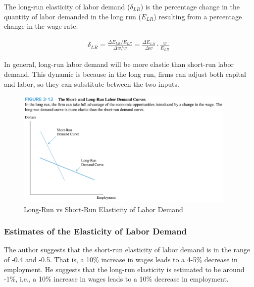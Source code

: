\FloatBarrier


\begin{definition}

    The long-run elasticity of labor demand ($\delta_{LR}$)
    is the percentage change in the quantity of labor demanded in the
    long run ($E_{LR}$)
    resulting from a percentage change in the wage rate.
    
    \begin{align}
        \delta_{L R}=\frac{\Delta E_{L R} / E_{L R}}{\Delta w / w}=\frac{\Delta E_{L R}}{\Delta w} \cdot \frac{w}{E_{L R}}
    \end{align}
    
\end{definition}


In general, long-run labor demand will be more 
elastic than short-run labor demand. This dynamic is 
because in the long run, firms can adjust 
both capital and labor, so they can 
substitute between the two inputs.

\FloatBarrier

\begin{figure}[!htb]
    \centering
        \includegraphics[width=0.95\textwidth]{../input/ch_3p4_long_v_short_run.png}
    \caption{Long-Run vs Short-Run Elasticity of Labor Demand}
    \label{fig:ch_3p4_long_v_short_run}
\end{figure}

\FloatBarrier

\subsubsection{Estimates of the Elasticity of Labor Demand}

The author suggests that the short-run 
elasticity of labor demand is in the range of 
-0.4 and -0.5. That is, a 10\% increase in wages
leads to a 4-5\% decrease in employment. 
He suggests that the long-run elasticity
is estimated to be around -1\%, i.e.,
a 10\% increase in wages leads to a 10\% decrease in employment.


